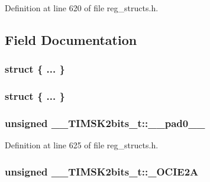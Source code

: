 Definition at line 620 of file reg\+\_\+structs.\+h.



\subsection{Field Documentation}
\hypertarget{union_____t_i_m_s_k2bits__t_aeb7dd0ceedc89137ab754e3b7542edec}{\subsubsection[{"@149}]{\setlength{\rightskip}{0pt plus 5cm}struct \{ ... \} }}\label{union_____t_i_m_s_k2bits__t_aeb7dd0ceedc89137ab754e3b7542edec}
\hypertarget{union_____t_i_m_s_k2bits__t_ab455a7b50d952229019d6a029cb994b9}{\subsubsection[{"@151}]{\setlength{\rightskip}{0pt plus 5cm}struct \{ ... \} }}\label{union_____t_i_m_s_k2bits__t_ab455a7b50d952229019d6a029cb994b9}
\hypertarget{union_____t_i_m_s_k2bits__t_a4871294780ace1b7f44fea277918c74c}{
\subsubsection[{\+\_\+\+\_\+pad0\+\_\+\+\_\+}]{\setlength{\rightskip}{0pt plus 5cm}unsigned \+\_\+\+\_\+\+T\+I\+M\+S\+K2bits\+\_\+t\+::\+\_\+\+\_\+pad0\+\_\+\+\_\+}}\label{union_____t_i_m_s_k2bits__t_a4871294780ace1b7f44fea277918c74c}


Definition at line 625 of file reg\+\_\+structs.\+h.

\hypertarget{union_____t_i_m_s_k2bits__t_a706c0a8f768fcc9d22972e9ce4106453}{
\subsubsection[{\+\_\+\+O\+C\+I\+E2\+A}]{\setlength{\rightskip}{0pt plus 5cm}unsigned \+\_\+\+\_\+\+T\+I\+M\+S\+K2bits\+\_\+t\+::\+\_\+\+O\+C\+I\+E2\+A}}\label{union_____t_i_m_s_k2bits__t_a706c0a8f768fcc9d22972e9ce4106453}


